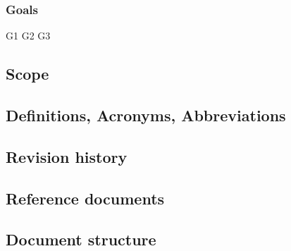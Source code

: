 \subsubsection{Goals}

G1
G2
G3

\subsection{Scope}

\subsection{Definitions, Acronyms, Abbreviations}
\subsection{Revision history}
\subsection{Reference documents}
\subsection{Document structure}
